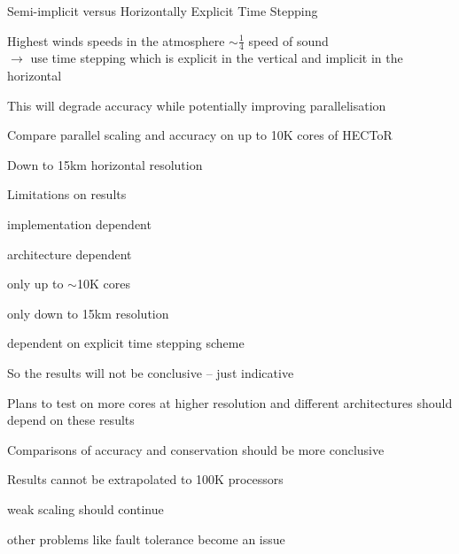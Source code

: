 \begin{slide}{Semi-implicit versus Horizontally Explicit Time Stepping}

\begin{list0}

\item Highest winds speeds in the atmosphere $\sim \frac{1}{4}$ speed of sound\\
$\rightarrow$ use time stepping which is explicit in the vertical and implicit in the horizontal

\item This will degrade accuracy while potentially improving parallelisation

\item Compare parallel scaling and accuracy on up to 10K cores of HECToR

\item Down to 15km horizontal resolution

\item Limitations on results
    \begin{list1}
    \item implementation dependent
    \item architecture dependent
    \item only up to $\sim$10K cores
    \item only down to 15km resolution
    \item dependent on explicit time stepping scheme
    \end{list1}

\item So the results will not be conclusive -- just indicative

\item Plans to test on more cores at higher resolution and different architectures should depend on these results

\item Comparisons of accuracy and conservation should be more conclusive

\item Results cannot be extrapolated to 100K processors
    \begin{list1}
    \item weak scaling should continue
    \item other problems like fault tolerance become an issue
    \end{list1}

\end{list0}

\end{slide}
